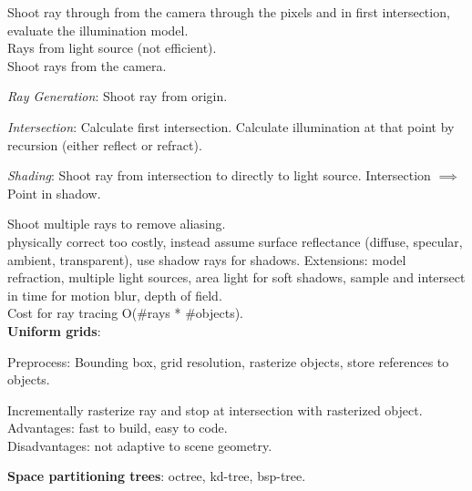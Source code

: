     Shoot ray through from the camera through the pixels and in first intersection, evaluate the illumination model.\\
    Rays from light source (not efficient).\\
    Shoot rays from the camera.\\
    \begin{compactenum}
      \item \textit{Ray Generation}: Shoot ray from origin.
      \item \textit{Intersection}: Calculate first intersection. Calculate illumination at that point by recursion (either reflect or refract).
      \item \textit{Shading}: Shoot ray from intersection to directly to light source. Intersection \(\implies\) Point in shadow.
    \end{compactenum}
   Shoot multiple rays to remove aliasing.\\
 physically correct too costly, instead assume surface reflectance (diffuse, specular, ambient, transparent), use shadow rays for shadows. Extensions: model refraction,  multiple light sources, area light for soft shadows, sample and intersect in time for motion blur, depth of field.\\
 Cost for ray tracing O(\#rays * \#objects). \\
\textbf{Uniform grids}:
\begin{compactitem}
    \item Preprocess: Bounding box, grid resolution, rasterize objects, store references to objects. 
    \item Incrementally rasterize ray and stop at intersection with rasterized object. \\Advantages: fast to build, easy to code. 
    \\Disadvantages: not adaptive to scene geometry.
\end{compactitem}
\textbf{Space partitioning trees}: octree, kd-tree, bsp-tree.